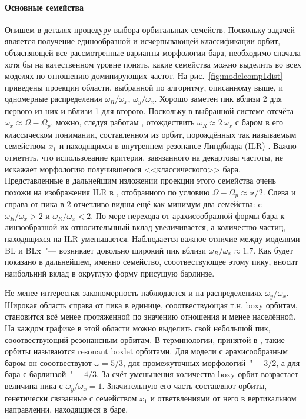 \documentclass[tikz]{trlnotes}
\begin{document}
\paragraph{Основные семейства}
Опишем в деталях процедуру выбора орбитальных семейств. 
Поскольку задачей является получение единообразной и исчерпывающей классификации орбит, объясняющей все рассмотренные
варианты морфологии бара, необходимо сначала хотя бы на качественном уровне понять, какие семейства можно выделить
во всех моделях по отношению доминирующих частот. На рис.~\ref{fig:modelcomp1dist} приведены проекции области,
выбранной по алгоритму, описанному выше, и одномерные распределения $ω_R/ω_x$, $ω_y/ω_x$. Хорошо заметен пик вблизи
2 для первого из них и вблизи 1 для второго. Поскольку в выбранной системе отсчёта $ω_x \approx Ω - Ω_p$, можно,
следуя работам \citet{gajda2016,portail2015},  отождествить $ω_R \approx 2\, ω_x$ с баром в его классическом
понимании, составленном из орбит,
порождённых так называемым семейством $x_1$ и находящихся в внутреннем резонансе Линдблада (ILR) \citep{athanassoula2003}.
Важно отметить, что использование критерия, завязанного на декартовы
частоты, не искажает морфологию получившегося <<классического>> бара. Представленные в дальнейшим изложении
проекции этого семейства очень похожи на изображения ILR в \citet[Fig.~10]{ceverino2007}, отобранного по условию $Ω - Ω_p
\approx ϰ/2$. Слева и справа от пика в $2$ отчетливо видны ещё как минимум два семейства:
c $ω_R/ω_x > 2$ и $ω_R/ω_x < 2$.  По мере перехода от арахисообразной формы бара к линзообразной их
относительнный вклад увеличивается, а количество частиц, находящихся на ILR уменьшается. Наблюдается важное отличие между моделями BL и BLx~"--- возникает довольно широкий пик вблизи $ω_R/ω_x \approx 1.7$. Как будет
показано в дальнейшем, именно семейство, сооотвествующее этому пику, вносит наибольний вклад в округлую форму
присущую барлинзе.

Не менее интересная закономерность наблюдается и на распределениях $ω_y/ω_x$. Широкая область справа от пика в
единице, сооотвествующая т.н. boxy орбитам, становится всё менее протяженной по значению отношения и менее
населённой. На каждом графике в этой области можно выделить свой небольшой пик, сооотвествующий резонансным орбитам. В
терминологии, принятой в \cite{valluri2016}, такие орбиты называются resonant boxlet орбитами. Для модели с арахисообразным
баром он сооотвествуют $ω=5/3$, для промежуточных морфологий~"--- $3/2$, а для бара с барлинзой~"--- $4/3$.
За счёт уменьшения количества boxy орбит возрастает величина пика с $ω_y/ω_x = 1$. Значительную его часть
составляют орбиты, генетически связанные с семейством $x_1$ и ответвлениями от него в вертикальном направлении,
находящиеся в баре.
\end{document}
